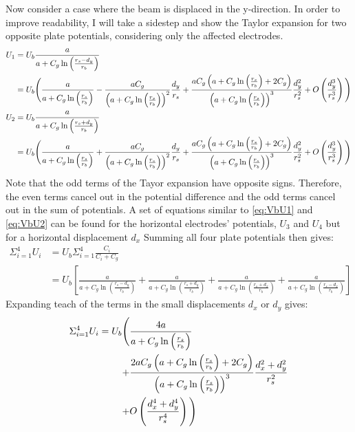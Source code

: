 Now consider a case where the beam is displaced in the y-direction. In order to improve readability, I will take a sidestep and show the Taylor expansion for two opposite plate potentials, considering only the affected electrodes.
\begin{align}
U_1 &= U_b \frac{a}{a+C_g\ln\left(\frac{r_s-d_y}{r_b}\right)} \nonumber \\
&= U_b \Bigg{(} \frac{a}{a+C_g\ln\left(\frac{r_s}{r_b}\right)} %
- \frac{aC_g}{\left( a+C_g \ln\left(\frac{r_s}{r_b}\right)  \right)^2}\frac{d_y}{r_s} %
+ \frac{a C_g \left( a + C_g \ln\left( \frac{r_s}{r_b} \right) + 2C_g\right)}{ \left( a+C_g\ln\left(\frac{r_s}{r_b}\right) \right)^3}\frac{d_y^2}{r_s^2} %
+O\left(\frac{d_y^3}{r_s^3}\right) \Bigg{)} \label{eq:VbU1}\\
U_2 &= U_b \frac{a}{a+C_g\ln\left(\frac{r_s+d_y}{r_b}\right)} \nonumber \\
&= U_b \Bigg{(} \frac{a}{a+C_g\ln\left(\frac{r_s}{r_b}\right)} %
+ \frac{aC_g}{\left( a+C_g \ln\left(\frac{r_s}{r_b}\right)  \right)^2}\frac{d_y}{r_s} %
+ \frac{a C_g \left( a + C_g \ln\left( \frac{r_s}{r_b} \right) + 2C_g\right)}{ \left( a+C_g\ln\left(\frac{r_s}{r_b}\right) \right)^3}\frac{d_y^2}{r_s^2} %
+O\left(\frac{d_y^3}{r_s^3}\right) \Bigg{)} \label{eq:VbU2}
\end{align}
Note that the odd terms of the Tayor expansion have opposite signs. Therefore, the even terms cancel out in the potential difference and the odd terms cancel out in the sum of potentials. A set of equations similar to \ref{eq:VbU1} and \ref{eq:VbU2} can be found for the horizontal electrodes' potentials, $U_3$ and $U_4$ but for a horizontal displacement $d_x$
Summing all four plate potentials then gives:
\begin{align*}
\Sigma_{i=1}^4 U_i &= U_b \Sigma_{i=1}^4 \frac{C_i}{C_i+C_g} \nonumber\\
&= U_b \left[ \frac{a}{a+C_g\ln\left(\frac{r_s-d_y}{r_b} \right)} + \frac{a}{a+C_g\ln\left(\frac{r_s+d_y}{r_b} \right)} + \frac{a}{a+C_g\ln\left(\frac{r_s+d_x}{r_b} \right)} + \frac{a}{a+C_g\ln\left(\frac{r_s-d_x}{r_b} \right)} \right]
\end{align*}
Expanding teach of the terms in the small displacements $d_x$ or $d_y$ gives:
\begin{align}
\Sigma_{i=1}^4 U_i = U_b \Bigg{(}
  &\frac{4a}{a+C_g\ln\left(\frac{r_s}{r_b} \right)} \nonumber \\
+ &\frac{2aC_g\left(a+C_g\ln\left(\frac{r_s}{r_b} \right) +2C_g \right)}{\left(a+C_g\ln\left(\frac{r_s}{r_b} \right)\right)^3} \frac{d_x^2+d_y^2}{r_s^2} \nonumber \\
+ &O\left(\frac{d_x^4+d_y^4}{r_s^4} \right) \Bigg{)}
\label{eq:Vbtotal}
\end{align}
